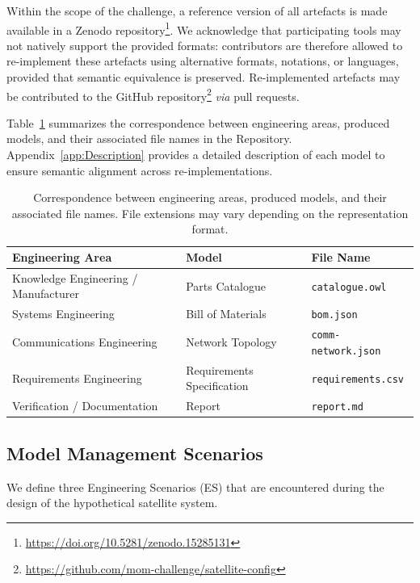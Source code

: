 \documentclass{article}
\begin{document}
Within the scope of the challenge, a reference version of all artefacts is made
available in a Zenodo repository\footnote{\url{https://doi.org/10.5281/zenodo.15285131}}. We acknowledge that participating tools may not
natively support the provided formats: contributors are therefore allowed to
re-implement these artefacts using alternative formats, notations, or languages,
provided that semantic equivalence is preserved. Re-implemented artefacts may be
contributed to the GitHub repository\footnote{\url{https://github.com/mom-challenge/satellite-config}} \emph{via} pull requests.

Table~\ref{tab:Models-File} summarizes the correspondence between engineering
areas, produced models, and their associated file names in the Repository.
Appendix~\ref{app:Description} provides a detailed description of each model to
ensure semantic alignment across re-implementations.

\begin{table}[t]
\centering
\caption{Correspondence between engineering areas, produced models, and their associated file names. File extensions may vary depending on the representation format.}
\label{tab:Models-File}
\centering
\begin{tabular}{lll}
\hline
\textbf{Engineering Area} & \textbf{Model} & \textbf{File Name} \\
\hline
Knowledge Engineering / Manufacturer & Parts Catalogue & \texttt{catalogue.owl} \\
Systems Engineering & Bill of Materials & \texttt{bom.json} \\
Communications Engineering & Network Topology & \texttt{comm-network.json} \\

Requirements Engineering & Requirements Specification & \texttt{requirements.csv} \\
Verification / Documentation & Report & \texttt{report.md} \\
\hline
\end{tabular}
\end{table}


\newpage
\subsection{Model Management Scenarios}
\label{sec:CD-MoMS}

We define three Engineering Scenarios (ES) that are encountered during the design of the hypothetical satellite system.
\end{document}
